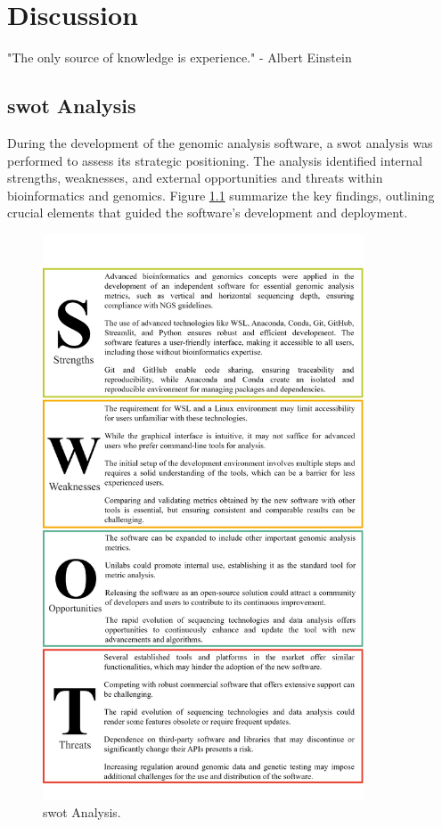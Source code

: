 \chapter{Discussion}
\label{chapter:Discussion}

\begin{introduction}
    "The only source of knowledge is experience." - Albert Einstein
\end{introduction}


\section{\acs{swot} Analysis} \label{sec:intro_swot}

During the development of the genomic analysis software, a \ac{swot} analysis was performed to assess its strategic positioning. The analysis identified internal strengths, weaknesses, and external opportunities and threats within bioinformatics and genomics. Figure \ref{fig:swot} summarize the key findings, outlining crucial elements that guided the software's development and deployment.

\begin{figure}[H]
    \centering
    \includegraphics[width=0.85\textwidth]{figs/swot.png}
    \caption{\ac{swot} Analysis.} 
    \label{fig:swot}
\end{figure}